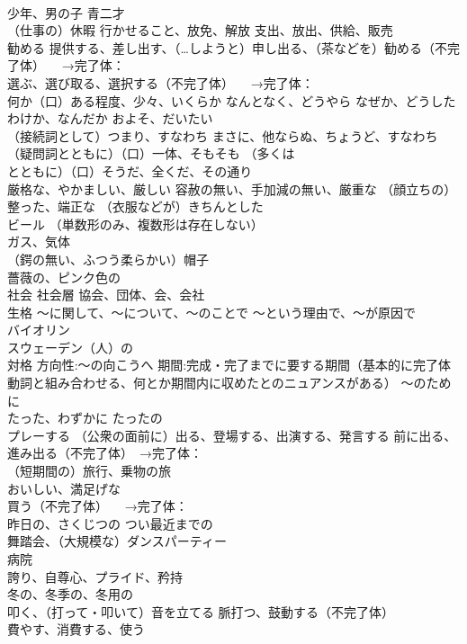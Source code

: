 \documentclass[8pt]{extreport}
\begin{document}
\begin{CJK}{UTF8}{min}
\\	少年、男の子 青二才
\\	（仕事の）休暇 行かせること、放免、解放 支出、放出、供給、販売
\\	勧める 提供する、差し出す、（…しようと）申し出る、（茶などを）勧める（不完了体） 　→完了体：
\\	選ぶ、選び取る、選択する（不完了体） 　→完了体：
\\	何か（口）ある程度、少々、いくらか なんとなく、どうやら なぜか、どうしたわけか、なんだか およそ、だいたい
\\	（接続詞として）つまり、すなわち まさに、他ならぬ、ちょうど、すなわち （疑問詞とともに）（口）一体、そもそも （多くは
\\	とともに）（口）そうだ、全くだ、その通り
\\	厳格な、やかましい、厳しい 容赦の無い、手加減の無い、厳重な （顔立ちの）整った、端正な （衣服などが）きちんとした
\\	ビール （単数形のみ、複数形は存在しない）
\\	ガス、気体
\\	（鍔の無い、ふつう柔らかい）帽子
\\	薔薇の、ピンク色の
\\	社会 社会層 協会、団体、会、会社
\\	生格	～に関して、～について、～のことで ～という理由で、～が原因で
\\	バイオリン
\\	スウェーデン（人）の
\\	対格	方向性:～の向こうへ 期間:完成・完了までに要する期間（基本的に完了体動詞と組み合わせる、何とか期間内に収めたとのニュアンスがある） ～のために
\\	たった、わずかに たったの
\\	プレーする （公衆の面前に）出る、登場する、出演する、発言する 前に出る、進み出る（不完了体）　→完了体：
\\	（短期間の）旅行、乗物の旅
\\	おいしい、満足げな
\\	買う（不完了体） 　→完了体：
\\	昨日の、さくじつの つい最近までの
\\	舞踏会、（大規模な）ダンスパーティー
\\	病院
\\	誇り、自尊心、プライド、矜持
\\	冬の、冬季の、冬用の
\\	叩く、（打って・叩いて）音を立てる 脈打つ、鼓動する（不完了体）
\\	費やす、消費する、使う 

\end{CJK}
\end{document}
